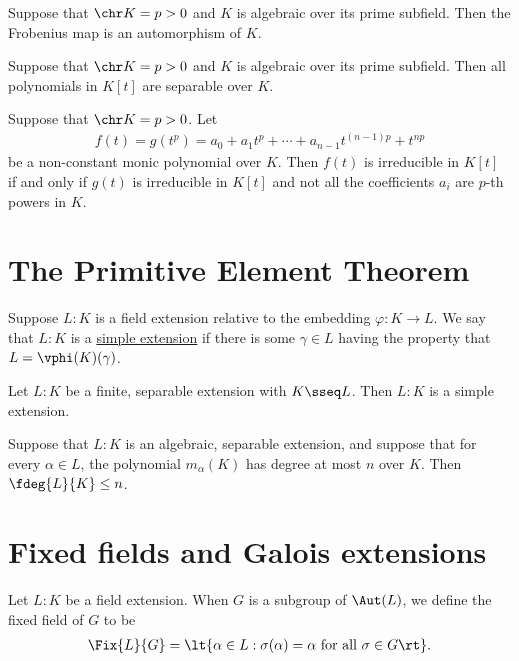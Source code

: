 \documentclass{article}
\begin{document}
  \begin{tcorollary}
    Suppose that \( \chr K = p > 0 \) and \( K \) is algebraic over its prime subfield.
    Then the Frobenius map is an automorphism of \( K \).
  \end{tcorollary}

  \begin{tcorollary}
    Suppose that \( \chr K = p > 0 \) and \( K \) is algebraic over its prime subfield.
    Then all polynomials in \( K[t] \) are separable over \( K \).
  \end{tcorollary}

  \begin{ttheorem}
    Suppose that \( \chr K = p > 0 \).
    Let \begin{align*}
      f(t) = g(t^p) = a_0+a_1t^p+\cdots+a_{n-1}t^{(n-1)p}+t^{np}
    \end{align*}
    be a non-constant monic polynomial over \( K \).
    Then \( f(t) \) is irreducible in \( K[t] \) if and only if \( g(t) \) is irreducible in \( K[t] \) and not all the coefficients \( a_i \) are \( p \)-th powers in \( K \).
  \end{ttheorem}

\section{The Primitive Element Theorem}
  \begin{tdefinition}
    Suppose \( L:K \) is a field extension relative to the embedding \( \varphi:K\to L \).
    We say that \( L:K \) is a \ul{simple extension} if there is some \( \gamma\in L \) having the property that \( L=\vphi(K)(\gamma) \).
  \end{tdefinition}

  \begin{ttheorem}
    Let \( L:K \) be a finite, separable extension with \( K\sseq L \).
    Then \( L:K \) is a simple extension.
  \end{ttheorem}

  \begin{tcorollary}
    Suppose that \( L:K \) is an algebraic, separable extension, and suppose that for every \( \alpha\in L \), the polynomial \( m_\alpha(K) \) has degree at most \( n \) over \( K \).
    Then \( \fdeg{L}{K}\leq n \).
  \end{tcorollary}

\section{Fixed fields and Galois extensions}
  \begin{tdefinition}
    Let \( L:K \) be a field extension.
    When \( G \) is a subgroup of \( \Aut(L) \), we define the fixed field of \( G \) to be \begin{align*}
      \Fix{L}{G} = \lt\{ \alpha\in L : \sigma(\alpha) = \alpha \text{ for all } \sigma\in G \rt\}.
    \end{align*}
  \end{tdefinition}
\end{document}
